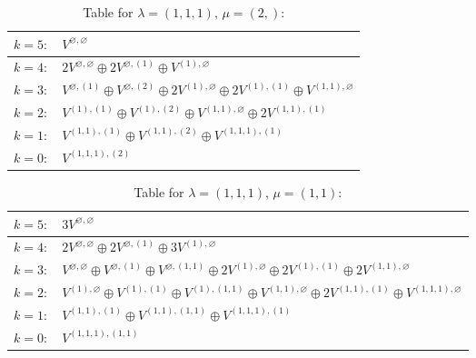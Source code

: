 \documentclass[a4paper,12pt]{article}
\begin{document}
\renewcommand{\arraystretch}{1.6} 
\begin{table}[H]
\centering
\caption{Table for $\lambda = (1, 1, 1)$, $\mu = (2,)$:}
\begin{tabular}{|>{\centering\arraybackslash}p{15cm}|}
\hline
 $k = 5: \quad V^{\varnothing, \varnothing} $ \\ \hline
 $k = 4: \quad 2 V^{\varnothing, \varnothing} \oplus 2 V^{\varnothing, (1)} \oplus V^{(1), \varnothing} $ \\ \hline
 $k = 3: \quad V^{\varnothing, (1)} \oplus V^{\varnothing, (2)} \oplus 2 V^{(1), \varnothing} \oplus 2 V^{(1), (1)} \oplus V^{(1, 1), \varnothing} $ \\ \hline
 $k = 2: \quad V^{(1), (1)} \oplus V^{(1), (2)} \oplus V^{(1, 1), \varnothing} \oplus 2 V^{(1, 1), (1)} $ \\ \hline
 $k = 1: \quad V^{(1, 1), (1)} \oplus V^{(1, 1), (2)} \oplus V^{(1, 1, 1), (1)} $ \\ \hline
 $k = 0: \quad V^{(1, 1, 1), (2)} $ \\ \hline
\end{tabular}
\end{table}

\renewcommand{\arraystretch}{1.6} 
\begin{table}[H]
\centering
\caption{Table for $\lambda = (1, 1, 1)$, $\mu = (1, 1)$:}
\begin{tabular}{|>{\centering\arraybackslash}p{15cm}|}
\hline
 $k = 5: \quad 3 V^{\varnothing, \varnothing} $ \\ \hline
 $k = 4: \quad 2 V^{\varnothing, \varnothing} \oplus 2 V^{\varnothing, (1)} \oplus 3 V^{(1), \varnothing} $ \\ \hline
 $k = 3: \quad V^{\varnothing, \varnothing} \oplus V^{\varnothing, (1)} \oplus V^{\varnothing, (1, 1)} \oplus 2 V^{(1), \varnothing} \oplus 2 V^{(1), (1)} \oplus 2 V^{(1, 1), \varnothing} $ \\ \hline
 $k = 2: \quad V^{(1), \varnothing} \oplus V^{(1), (1)} \oplus V^{(1), (1, 1)} \oplus V^{(1, 1), \varnothing} \oplus 2 V^{(1, 1), (1)} \oplus V^{(1, 1, 1), \varnothing} $ \\ \hline
 $k = 1: \quad V^{(1, 1), (1)} \oplus V^{(1, 1), (1, 1)} \oplus V^{(1, 1, 1), (1)} $ \\ \hline
 $k = 0: \quad V^{(1, 1, 1), (1, 1)} $ \\ \hline
\end{tabular}
\end{table}
\end{document}
